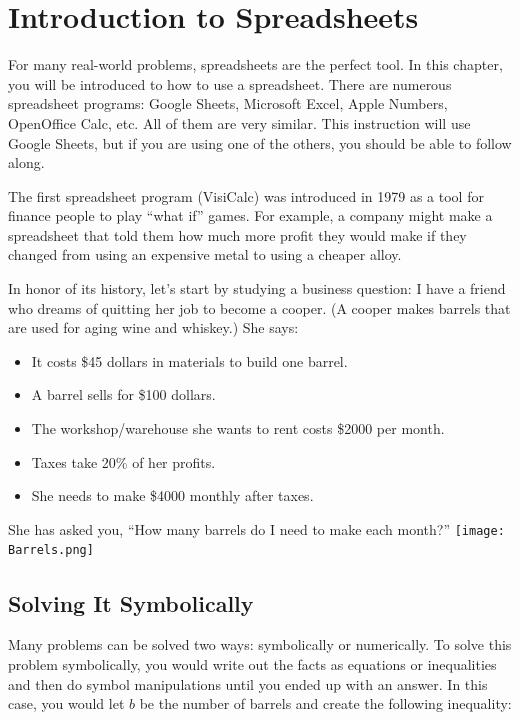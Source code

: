 \chapter{Introduction to Spreadsheets}

For many real-world problems, spreadsheets are the perfect
tool. In this chapter, you will be introduced to how to use a
spreadsheet. There are numerous spreadsheet programs: Google Sheets,
Microsoft Excel, Apple Numbers, OpenOffice Calc, etc.  All of them are
very similar. This instruction will use Google Sheets, but if you are using one
of the others, you should be able to follow along.

The first spreadsheet program (VisiCalc) was introduced in 1979 as a
tool for finance people to play ``what if'' games.  For example, a
company might make a spreadsheet that told them how much more profit
they would make if they changed from using an expensive metal to using
a cheaper alloy.

In honor of its history, let's start by studying a business question:
I have a friend who dreams of quitting her job to become a cooper. (A
cooper makes barrels that are used for aging wine and whiskey.)  She
says:
\begin{itemize}
\item It costs \$45 dollars in materials to build one barrel.
\item A barrel sells for \$100 dollars.
\item The workshop/warehouse she wants to rent costs \$2000 per month.
\item Taxes take 20\% of her profits.
\item She needs to make \$4000 monthly after taxes.
\end{itemize}

She has asked you, ``How many barrels do I need to make each month?''
\texttt{[image: Barrels.png]}

\section{Solving It Symbolically}

Many problems can be solved two ways: symbolically or
numerically. To solve this
problem symbolically, you would write out the facts as equations or
inequalities and then do symbol manipulations until you ended up with
an answer. In this case, you would let $b$ be the number of barrels
and create the following inequality:

